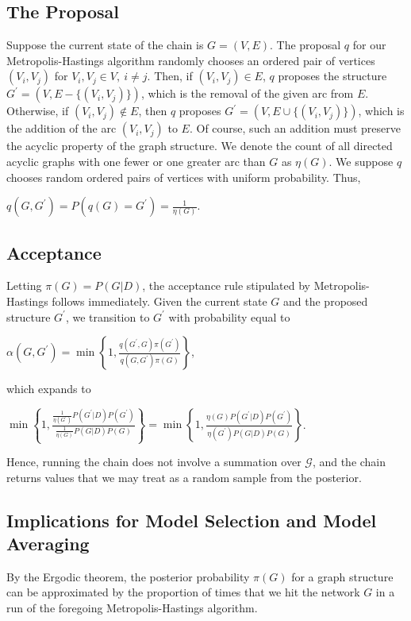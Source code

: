 \documentclass[12pt,twoside]{reedthesis}
\begin{document}
		\subsection*{The Proposal}
			Suppose the current state of the chain is $G=(V,E)$. 
			The proposal $q$ for our Metropolis-Hastings algorithm randomly chooses an ordered pair of vertices $(V_i, V_j)$ for $V_i, V_j \in V, \ i \neq j$. 
			Then, if $(V_i, V_j) \in E$, $q$ proposes the structure $G^{'} = (V,E - \{(V_i,V_j)\})$, which is the removal of the given arc from $E$. 
			Otherwise, if $(V_i,V_j) \not\in E$, then $q$ proposes $G^{'} = (V, E \cup \{(V_i, V_j)\})$, which is the addition of the arc $(V_i, V_j)$ to $E$. Of course, such an addition must preserve the acyclic property of the graph structure. 
			We denote the count of all directed acyclic graphs with one fewer or one greater arc than $G$ as $\eta(G)$. 
			We suppose $q$ chooses random ordered pairs of vertices with uniform probability. Thus,
			\begin{center}
			$q(G,G^{'}) = P(q(G) = G^{'}) = \frac{1}{\eta(G)}$.
			\end{center}
		\subsection*{Acceptance}
			Letting $\pi(G) = P(G|D)$,
			the acceptance rule stipulated by Metropolis-Hastings follows immediately. 
			Given the current state $G$ and the proposed structure $G^{'}$, 
			we transition to $G^{'}$ with probability equal to
			\begin{center}
				$
				\alpha(G,G^{'}) = 
				\displaystyle \min \left\{ 1, \frac{q(G^{'}, G)\pi(G^{'})}{q(G, G^{'})\pi(G)}  \right\}
				$,
			\end{center}
				which expands to
			\begin{center}
				$
				\displaystyle \min \left\{ 1, \frac{\frac{1}{\eta(G^{'})}P(G^{'} | D)P(G^{'})}{\frac{1}{\eta(G)}P(G|D)P(G)} \right\} =
				\displaystyle \min \left\{ 1, \frac{\eta(G)P(G^{'} | D)P(G^{'})}{\eta(G^{'})P(G|D)P(G)} \right\}				
				$.
			\end{center}
			Hence, running the chain does not involve a summation over $\mathcal G$, 
			and the chain returns values that we may treat as a random sample from the posterior.
		\subsection*{Implications for Model Selection and Model Averaging}
			By the Ergodic theorem, the posterior probability $\pi(G)$ for a graph structure can be approximated by the proportion of times that we hit the network $G$ in a run of the foregoing Metropolis-Hastings algorithm. 
			
\end{document}
